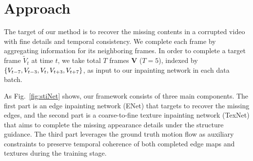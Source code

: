 

\section{Approach}\label{sec:approach}

The target of our method is to recover the missing contents in a corrupted video with fine details and temporal consistency.
%
We complete each frame by aggregating information for its neighboring frames. 
In order to complete a target frame $\widetilde{V}_t$ at time $t$, we take total $T$ frames $\boldsymbol{V}$ ($T=5$), indexed by $\{V_{t-7},V_{t-3},V_{t},V_{t+3},V_{t+7}\}$, as input to our inpainting network in each data batch. 

As Fig.~\ref{fig:stiNet} shows, our framework consists of three main components. 
The first part is an edge inpainting network (ENet) that targets to recover the missing edges, and the second part is a coarse-to-fine texture inpainting network (TexNet) that aims to complete the missing appearance details under the structure guidance.
The third part leverages the ground truth motion flow as auxiliary constraints to preserve temporal coherence of both completed edge maps and textures during the training stage.


